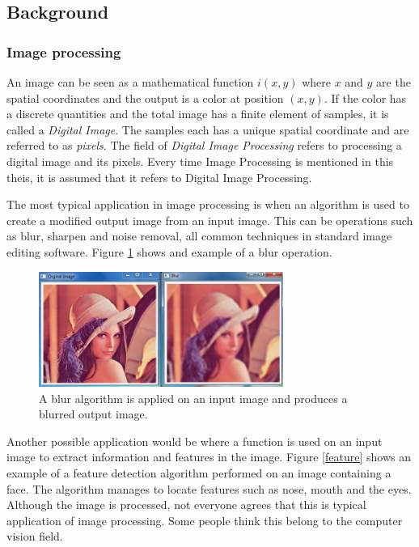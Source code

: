 \subsection{Background}
\subsubsection{Image processing}
An image can be seen as a mathematical function $i(x,y)$ where $x$ and $y$ are the spatial coordinates and the output is a color at position $(x,y)$. If the color has a discrete quantities and the total image has a finite element of samples, it is called a \emph{Digital Image}. The samples each has a unique spatial coordinate and are referred to as \emph{pixels}. The field of \emph{Digital Image Processing} refers to processing a digital image and its pixels. Every time Image Processing is mentioned in this theis, it is assumed that it refers to Digital Image Processing. 
\newline

The most typical application in image processing is when an algorithm is used to create a modified output image from an input image. This can be operations such as blur, sharpen and noise removal, all common techniques in standard image editing software. Figure \ref{lena} shows and example of a blur operation.
\begin{figure}[ht!]
\centering
\includegraphics[width=80mm]{img/lena.png}
\caption{A blur algorithm is applied on an input image and produces a blurred output image.}
\label{lena}
\end{figure}

Another possible application would be where a function is used on an input image to extract information and features in the image. Figure \ref{feature} shows an example of a feature detection algorithm performed on an image containing a face. The algorithm manages to locate features such as nose, mouth and the eyes. Although the image is processed, not everyone agrees that this is typical application of image processing. Some people think this belong to the computer vision field. 


